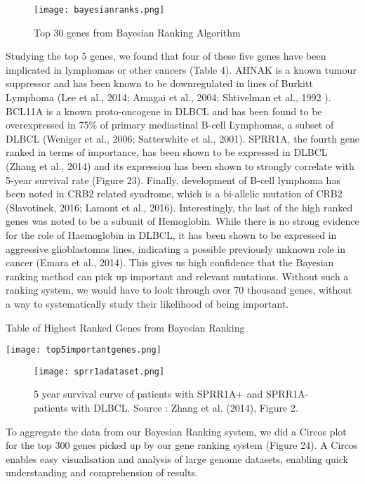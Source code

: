\documentclass{article}
\begin{document}
\begin{figure}[H]
\texttt{[image: bayesianranks.png]}
\caption{Top 30 genes from Bayesian Ranking Algorithm}
\centering
\end{figure}

Studying the top 5 genes, we found that four of these five genes have been implicated in lymphomas or other cancers (Table 4). AHNAK is a known tumour suppressor and has been known to be downregulated in lines of Burkitt Lymphoma (Lee et al., 2014; Amagai et al., 2004; Shtivelman et al., 1992
). BCL11A is a known proto-oncogene in DLBCL and has been found to be overexpressed in 75\% of primary mediastinal B-cell Lymphomas, a subset of DLBCL (Weniger et al., 2006; Satterwhite et al., 2001). SPRR1A, the fourth gene ranked in terms of importance, has been shown to be expressed in DLBCL (Zhang et al., 2014) and its expression has been shown to strongly correlate with 5-year survival rate (Figure 23). Finally, development of B-cell lymphoma has been noted in CRB2 related syndrome, which is a bi-allelic mutation of CRB2 (Slavotinek, 2016; Lamont et al., 2016). Interestingly, the last of the high ranked genes was noted to be a subunit of Hemoglobin. While there is no strong evidence for the role of Haemoglobin in DLBCL, it has been shown to be expressed in aggressive glioblastomas lines, indicating a possible previously unknown role in cancer (Emara et al., 2014). This gives us high confidence that the Bayesian ranking method can pick up important and relevant mutations. Without such a ranking system, we would have to look through over 70 thousand genes, without a way to systematically study their likelihood of being important. 

\begin{table}[H]
\caption{Table of Highest Ranked Genes from Bayesian Ranking}
\texttt{[image: top5importantgenes.png]}
\centering
\end{table}

\begin{figure}[H]
\centering
\texttt{[image: sprr1adataset.png]}
\caption{5 year survival curve of patients with SPRR1A+ and SPRR1A- patients with DLBCL. Source : Zhang et al. (2014), Figure 2.}
\end{figure}


To aggregate the data from our Bayesian Ranking system, we did a Circos plot for the top 300 genes picked up by our gene ranking system (Figure 24). A Circos enables easy visualisation and analysis of large genome datasets, enabling quick understanding and comprehension of results. 
\end{document}
